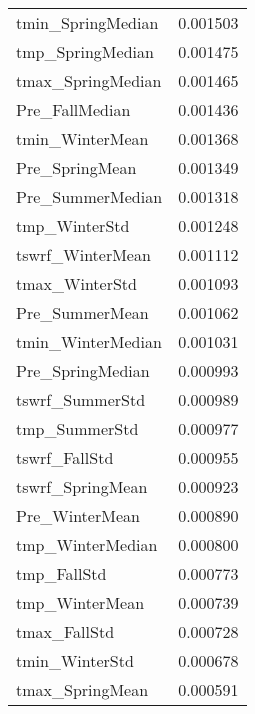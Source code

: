 \begin{tabular}{lr}
tmin_SpringMedian & 0.001503 \\
tmp_SpringMedian & 0.001475 \\
tmax_SpringMedian & 0.001465 \\
Pre_FallMedian & 0.001436 \\
tmin_WinterMean & 0.001368 \\
Pre_SpringMean & 0.001349 \\
Pre_SummerMedian & 0.001318 \\
tmp_WinterStd & 0.001248 \\
tswrf_WinterMean & 0.001112 \\
tmax_WinterStd & 0.001093 \\
Pre_SummerMean & 0.001062 \\
tmin_WinterMedian & 0.001031 \\
Pre_SpringMedian & 0.000993 \\
tswrf_SummerStd & 0.000989 \\
tmp_SummerStd & 0.000977 \\
tswrf_FallStd & 0.000955 \\
tswrf_SpringMean & 0.000923 \\
Pre_WinterMean & 0.000890 \\
tmp_WinterMedian & 0.000800 \\
tmp_FallStd & 0.000773 \\
tmp_WinterMean & 0.000739 \\
tmax_FallStd & 0.000728 \\
tmin_WinterStd & 0.000678 \\
tmax_SpringMean & 0.000591 \\
\bottomrule
\end{tabular}
